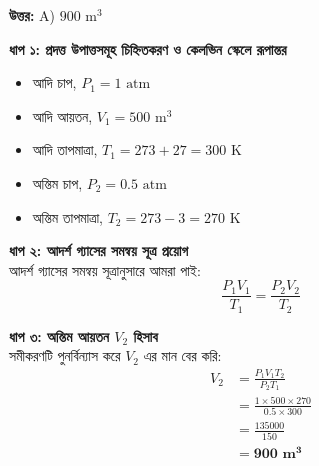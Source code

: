 \documentclass[12pt, a4paper]{article}
\begin{document}
\vspace{0.5em}
\begin{tcolorbox}[answerbox]
    \textbf{\color{success} উত্তর:} A) $900\text{ m}^3$
\end{tcolorbox}
\vspace{1em}

\begin{tcolorbox}[solutionbox={সমাধান (Solution)}]
    \noindent
    \textbf{ধাপ ১: প্রদত্ত উপাত্তসমূহ চিহ্নিতকরণ ও কেলভিন স্কেলে রূপান্তর}
    \begin{itemize}[leftmargin=1.5em, itemsep=0.2em]
        \item আদি চাপ, $P_1 = 1\text{ atm}$
        \item আদি আয়তন, $V_1 = 500\text{ m}^3$
        \item আদি তাপমাত্রা, $T_1 = 273 + 27 = 300\text{ K}$
        \item অন্তিম চাপ, $P_2 = 0.5\text{ atm}$
        \item অন্তিম তাপমাত্রা, $T_2 = 273 - 3 = 270\text{ K}$
    \end{itemize}
    
    \vspace{0.4em}
    \noindent\textbf{ধাপ ২: আদর্শ গ্যাসের সমন্বয় সূত্র প্রয়োগ} \\
    আদর্শ গ্যাসের সমন্বয় সূত্রানুসারে আমরা পাই:
    \[ \frac{P_1 V_1}{T_1} = \frac{P_2 V_2}{T_2} \]
    
    \vspace{0.4em}
    \noindent\textbf{ধাপ ৩: অন্তিম আয়তন $V_2$ হিসাব} \\
    সমীকরণটি পুনর্বিন্যাস করে $V_2$ এর মান বের করি:
    \begin{align*}
        V_2 &= \frac{P_1 V_1 T_2}{P_2 T_1} \\
            &= \frac{1 \times 500 \times 270}{0.5 \times 300} \\
            &= \frac{135000}{150} \\
            &= \mathbf{900\text{ m}^3}
    \end{align*}
\end{tcolorbox}

\vspace{2em}
\end{document}
